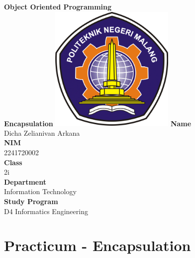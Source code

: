 \documentclass[12pt,titlepage]{article}
\newcommand{\vSubject}{Object Oriented Programming}
\newcommand{\vSubtitle}{Encapsulation}
\newcommand{\vName}{Dicha Zelianivan Arkana}
\newcommand{\vNIM}{2241720002}
\newcommand{\vClass}{2i}
\newcommand{\vDepartment}{Information Technology}
\newcommand{\vStudyProgram}{D4 Informatics Engineering}
\begin{document}
\begin{titlepage}
    \centering
    \vfill
    {\bfseries\LARGE
        \vSubject\\
        \vskip0.25cm
        \vSubtitle
    }
    \vfill
    \includegraphics[width=6cm]{images/polinema-logo.png}
    \vfill
    {
        \textbf{Name}\\
        \vName\\
        \vskip0.5cm
        \textbf{NIM}\\
        \vNIM\\
        \vskip0.5cm
        \textbf{Class}\\
        \vClass\\
        \vskip0.5cm
        \textbf{Department}\\
        \vDepartment\\
        \vskip0.5cm
        \textbf{Study Program}\\
        \vStudyProgram
    }
\end{titlepage}

\section{Practicum - Encapsulation}
\end{document}
